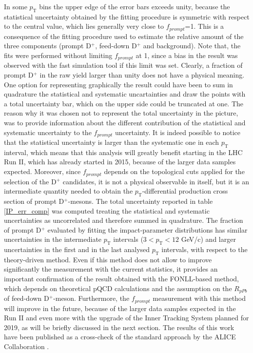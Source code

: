 \documentclass[b5paper,10pt,twoside,oldstyle,classica]{toptesi}
\newcommand{\pt}{p_\text{T}}
\begin{document}
\begin{figure}[tb]
\end{figure} In some $\pt$ bins the upper edge of the error bars exceeds unity, because the statistical uncertainty obtained by the fitting procedure is symmetric with respect to the central value, which lies generally very close to $f_{prompt}$=1. This is a consequence of the fitting procedure used to estimate the relative amount of the three components (prompt D$^+$, feed-down D$^+$ and background). Note that, the fits were performed without limiting $f_{prompt}$ at 1, since a bias in the result was observed with the fast simulation tool if this limit was set. Clearly, a fraction of prompt D$^+$ in the raw yield larger than unity does not have a physical meaning. One option for representing graphically the result could have been to sum in quadrature the statistical and systematic uncartainties and draw the points with a total uncertainty bar, which on the upper side could be truncated at one. The reason why it was chosen not to represent the total uncertainty in the picture, was to provide information about the different contribution of the statistical and systematic uncertainty to the $f_{prompt}$ uncertainty. It is indeed possible to notice that the statistical uncertainty is larger than the systematic one in each $\pt$ interval, which means that this analysis will greatly benefit starting in the LHC Run II, which has already started in 2015, because of the larger data samples expected. Moreover, since $f_{prompt}$ depends on the topological cuts applied for the selection of the D$^+$ candidates, it is not a physical observable in itself, but it is an intermediate quantity needed to obtain the $\pt$-differential production cross section of prompt D$^+$-mesons. The total uncertainty reported in table \ref{IP_err_comp} was computed treating the statistical and systematic uncertainties as uncorrelated and therefore summed in quadrature. The fraction of prompt D$^+$ evaluated by fitting the impact-parameter distributions has similar uncertainties in the intermediate $\pt$ intervals ($3<\pt<12$ GeV/c) and larger uncertainties in the first and in the last analysed $\pt$ intervals, with respect to the theory-driven method. Even if this method does not allow to improve significantly the measurement with the current statistics, it provides an important confirmation of the result obtained with the FONLL-based method, which depends on theoretical pQCD calculations and the assumption on the $R_{pPb}$ of feed-down D$^+$-meson. Furthermore, the $f_{prompt}$ measurement with this method will improve in the future, because of the larger data samples expected in the Run II and even more with the upgrade of the Inner Tracking System planned for 2019, as will be briefly discussed in the next section. The results of this work have been published as a cross-check of the standard approach by the ALICE Collaboration \cite{Adam:2016ich}. 
\end{document}
